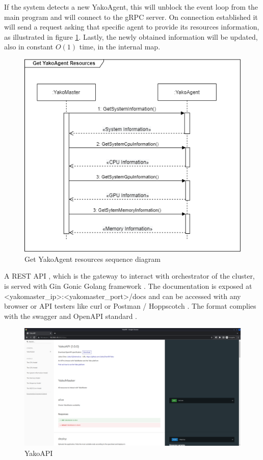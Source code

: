             If the system detects a new YakoAgent, this will unblock the event loop from the main program and will connect to the gRPC server. On connection established it will send a request asking that specific agent to provide its resources information, as illustrated in figure \ref{fig:get_yakoagent_resources_sd}. Lastly, the newly obtained information will be updated, also in constant \(O(1)\) time, in the internal map.
        
            \begin{figure}[H]
                \centering
                \includegraphics[width=0.5\linewidth]{Images/Backend/Get YakoAgent Resources SD.png}
                \caption{Get YakoAgent resources sequence diagram}
                \label{fig:get_yakoagent_resources_sd}
            \end{figure}
        
            A REST API \cite{redhat_que_2020}, which is the gateway to interact with orchestrator of the cluster, is served with Gin Gonic Golang framework \cite{gin_gonic_gin_nodate}. The documentation is exposed at <yakomaster\_ip>:<yakomaster\_port>/docs and can be accessed with any browser or API testers like curl \cite{curl_curl_nodate} or Postman \cite{postman_postman_nodate} / Hoppscotch \cite{hoppscotch_hoppscotchhoppscotch_2022}. The format complies with the swagger and OpenAPI standard \cite{openapi_initiative_openapi_nodate}.
            
            \begin{figure}[H]
                \centering
                \includegraphics[width=\linewidth]{Images/Backend/YakoAPI.png}
                \caption{YakoAPI}
                \label{fig:yako_api}
            \end{figure}
            
